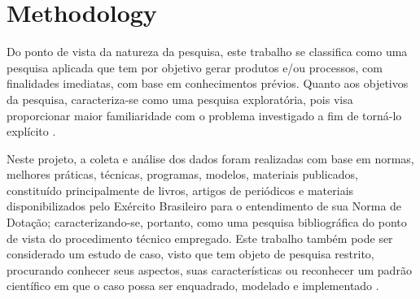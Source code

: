 \section{Methodology}\label{sec:Methodology}


Do ponto de vista da natureza da pesquisa, este trabalho se classifica como uma pesquisa aplicada que tem por objetivo gerar produtos e/ou processos, com finalidades imediatas, com base em conhecimentos prévios. Quanto aos objetivos da pesquisa, caracteriza-se como uma pesquisa exploratória, pois visa proporcionar maior familiaridade com o problema investigado a fim de torná-lo explícito \cite{michel2011metodologia}.

Neste projeto, a coleta e análise dos dados foram realizadas com base em normas, melhores práticas, técnicas, programas, modelos, materiais publicados, constituído principalmente de livros, artigos de periódicos \cite{michel2011metodologia} e materiais disponibilizados pelo Exército Brasileiro para o entendimento de sua Norma de Dotação; caracterizando-se, portanto, como uma pesquisa bibliográfica do ponto de vista do procedimento técnico empregado. Este trabalho também pode ser considerado um estudo de caso, visto que tem objeto de pesquisa restrito, procurando conhecer seus aspectos, suas características ou reconhecer um padrão científico em que o caso possa ser enquadrado, modelado e implementado \cite{travassos2002introduccao}.